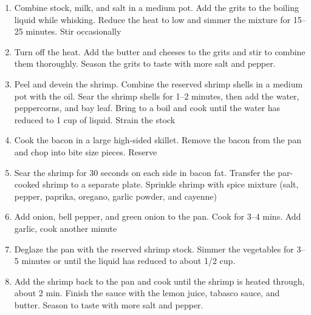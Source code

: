 \documentclass[]{report}
\begin{document}
            {\begin{enumerate}    %
                  \item  Combine stock, milk, and salt in a medium pot. Add the grits to the boiling liquid while whisking. Reduce the heat to low and simmer the mixture for 15--25 minutes. Stir occasionally
                  \item Turn off the heat. Add the butter and cheeses to the grits and stir to combine them thoroughly. Season the grits to taste with more salt and pepper.
                  \item Peel and devein the shrimp. Combine the reserved shrimp shells in a medium pot with the oil. Sear the shrimp shells for 1--2 minutes, then add the water, peppercorns, and bay leaf. Bring to a boil and cook until the water has reduced to 1 cup of liquid. Strain the stock
                  \item Cook the bacon in a large high-sided skillet. Remove the bacon from the pan and chop into bite size pieces. Reserve
                  \item Sear the shrimp for 30 seconds on each side in bacon fat. Transfer the par-cooked shrimp to a separate plate. Sprinkle shrimp with spice mixture (salt, pepper, paprika, oregano, garlic powder, and cayenne)
                  \item Add onion, bell pepper, and green onion to the pan. Cook for 3--4 mins. Add garlic, cook another minute 
                  \item Deglaze the pan with the reserved shrimp stock. Simmer the vegetables for 3--5 minutes or until the liquid has reduced to about 1/2 cup. 
                  \item Add the shrimp back to the pan and cook until the shrimp is heated through, about 2 min. Finish the sauce with the lemon juice, tabasco sauce, and butter. Season to taste with more salt and pepper.
            \end{enumerate}}
\end{document}
